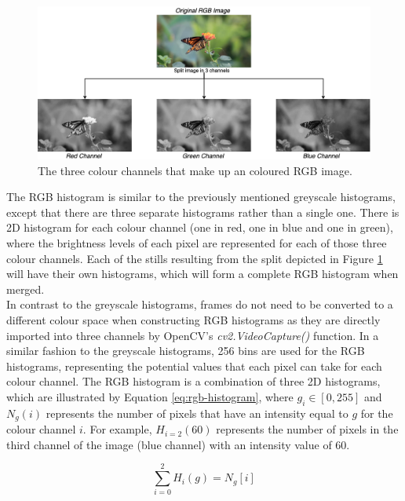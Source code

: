 \begin{figure}[h] 
\centerline{\includegraphics[width=\textwidth]{figures/implementation/rgb_image_channel_split.png}}
\caption{\label{fig:implementation-rgb_image_channel_split}The three colour channels that make up an coloured RGB image.}
\end{figure}

The RGB histogram is similar to the previously mentioned greyscale histograms, except that there are three separate histograms rather than a single one. There is 2D histogram for each colour channel (one in red, one in blue and one in green), where the brightness levels of each pixel are represented for each of those three colour channels. Each of the stills resulting from the split depicted in Figure \ref{fig:implementation-rgb_image_channel_split} will have their own histograms, which will form a complete RGB histogram when merged.\\

In contrast to the greyscale histograms, frames do not need to be converted to a different colour space when constructing RGB histograms as they are directly imported into three channels by OpenCV's \textit{cv2.VideoCapture()} function. In a similar fashion to the greyscale histograms, 256 bins are used for the RGB histograms, representing the potential values that each pixel can take for each colour channel. The RGB histogram is a combination of three 2D histograms, which are illustrated by Equation \ref{eq:rgb-histogram}, where $g_i\in [0, 255]$ and $N_g(i)$ represents the number of pixels that have an intensity equal to $g$ for the colour channel $i$. For example, $H_{i=2}(60)$ represents the number of pixels in the third channel of the image (blue channel) with an intensity value of 60.

\begin{equation}
\label{eq:rgb-histogram}
    \sum_{i=0}^{2} H_i(g)=N_g[i]
\end{equation}

